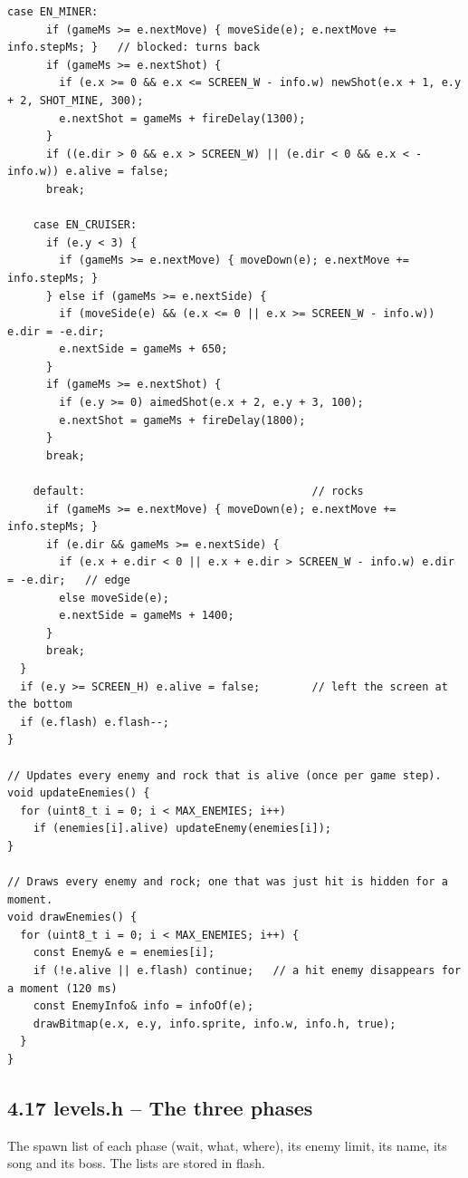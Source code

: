 \documentclass[11pt,a4paper]{article}
\begin{document}
\begin{lstlisting}[language=Arduino]
    case EN_MINER:
      if (gameMs >= e.nextMove) { moveSide(e); e.nextMove += info.stepMs; }   // blocked: turns back
      if (gameMs >= e.nextShot) {
        if (e.x >= 0 && e.x <= SCREEN_W - info.w) newShot(e.x + 1, e.y + 2, SHOT_MINE, 300);
        e.nextShot = gameMs + fireDelay(1300);
      }
      if ((e.dir > 0 && e.x > SCREEN_W) || (e.dir < 0 && e.x < -info.w)) e.alive = false;
      break;

    case EN_CRUISER:
      if (e.y < 3) {
        if (gameMs >= e.nextMove) { moveDown(e); e.nextMove += info.stepMs; }
      } else if (gameMs >= e.nextSide) {
        if (moveSide(e) && (e.x <= 0 || e.x >= SCREEN_W - info.w)) e.dir = -e.dir;
        e.nextSide = gameMs + 650;
      }
      if (gameMs >= e.nextShot) {
        if (e.y >= 0) aimedShot(e.x + 2, e.y + 3, 100);
        e.nextShot = gameMs + fireDelay(1800);
      }
      break;

    default:                                   // rocks
      if (gameMs >= e.nextMove) { moveDown(e); e.nextMove += info.stepMs; }
      if (e.dir && gameMs >= e.nextSide) {
        if (e.x + e.dir < 0 || e.x + e.dir > SCREEN_W - info.w) e.dir = -e.dir;   // edge
        else moveSide(e);
        e.nextSide = gameMs + 1400;
      }
      break;
  }
  if (e.y >= SCREEN_H) e.alive = false;        // left the screen at the bottom
  if (e.flash) e.flash--;
}

// Updates every enemy and rock that is alive (once per game step).
void updateEnemies() {
  for (uint8_t i = 0; i < MAX_ENEMIES; i++)
    if (enemies[i].alive) updateEnemy(enemies[i]);
}

// Draws every enemy and rock; one that was just hit is hidden for a moment.
void drawEnemies() {
  for (uint8_t i = 0; i < MAX_ENEMIES; i++) {
    const Enemy& e = enemies[i];
    if (!e.alive || e.flash) continue;   // a hit enemy disappears for a moment (120 ms)
    const EnemyInfo& info = infoOf(e);
    drawBitmap(e.x, e.y, info.sprite, info.w, info.h, true);
  }
}
\end{lstlisting}

\clearpage
\subsection*{4.17 levels.h – The three phases}
The spawn list of each phase (wait, what, where), its enemy limit, its name, its song and its boss. The lists are stored in flash.
\end{document}
